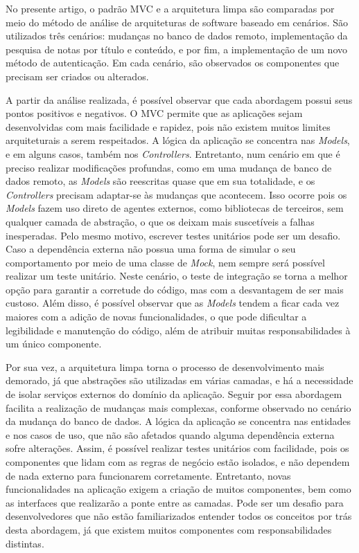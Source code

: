 No presente artigo, o padrão MVC e a arquitetura limpa são comparadas por meio do método de análise de arquiteturas de software baseado em cenários.
São utilizados três cenários: mudanças no banco de dados remoto, implementação da pesquisa de notas por título e conteúdo, e por fim, a implementação de um novo método de autenticação.
Em cada cenário, são observados os componentes que precisam ser criados ou alterados.

A partir da análise realizada, é possível observar que cada abordagem possui seus pontos positivos e negativos.
O MVC permite que as aplicações sejam desenvolvidas com mais facilidade e rapidez, pois não existem muitos limites arquiteturais a serem respeitados.
A lógica da aplicação se concentra nas \emph{Models}, e em alguns casos, também nos \emph{Controllers}.
Entretanto, num cenário em que é preciso realizar modificações profundas, como em uma mudança de banco de dados remoto, as \emph{Models} são reescritas quase que em sua totalidade, e os \emph{Controllers} precisam adaptar-se às mudanças que acontecem.
Isso ocorre pois os \emph{Models} fazem uso direto de agentes externos, como bibliotecas de terceiros, sem qualquer camada de abstração, o que os deixam mais suscetíveis a falhas inesperadas.
Pelo mesmo motivo, escrever testes unitários pode ser um desafio.
Caso a dependência externa não possua uma forma de simular o seu comportamento por meio de uma classe de \emph{Mock}, nem sempre será possível realizar um teste unitário.
Neste cenário, o teste de integração se torna a melhor opção para garantir a corretude do código, mas com a desvantagem de ser mais custoso.
Além disso, é possível observar que as \emph{Models} tendem a ficar cada vez maiores com a adição de novas funcionalidades, o que pode dificultar a legibilidade e manutenção do código, além de atribuir muitas responsabilidades à um único componente.

Por sua vez, a arquitetura limpa torna o processo de desenvolvimento mais demorado, já que abstrações são utilizadas em várias camadas, e há a necessidade de isolar serviços externos do domínio da aplicação.
Seguir por essa abordagem facilita a realização de mudanças mais complexas, conforme observado no cenário da mudança do banco de dados.
A lógica da aplicação se concentra nas entidades e nos casos de uso, que não são afetados quando alguma dependência externa sofre alterações.
Assim, é possível realizar testes unitários com facilidade, pois os componentes que lidam com as regras de negócio estão isolados, e não dependem de nada externo para funcionarem corretamente.
Entretanto, novas funcionalidades na aplicação exigem a criação de muitos componentes, bem como as interfaces que realizarão a ponte entre as camadas.
Pode ser um desafio para desenvolvedores que não estão familiarizados entender todos os conceitos por trás desta abordagem, já que existem muitos componentes com responsabilidades distintas.

